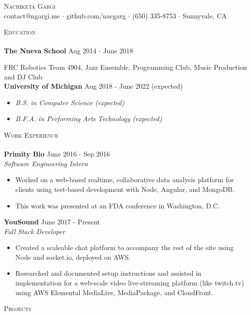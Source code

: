\documentclass[a4paper]{article}
\newcommand{\lineunder} {
    \vspace*{-8pt} \\
    \hspace*{-18pt} \hrulefill \\
}
\newcommand{\header} [1] {
    {\hspace*{-18pt}\vspace*{6pt} \textsc{#1}}
    \vspace*{-6pt} \lineunder
}
\begin{document}
\vspace*{-40pt}
    

\vspace*{-30pt}
\begin{center}
	{\Huge \scshape {Nachiketa Gargi}}\\
	contact@ngargi.me $\cdot$ github.com/nacgarg $\cdot$ (650) 335-8753 $\cdot$ Sunnyvale, CA \\
\end{center}
\header{Education}

\noindent
\textbf{The Nueva School} \hfill Aug 2014 - June 2018\\
\vspace{-4mm}

FRC Robotics Team 4904, Jazz Ensemble, Programming Club, Music Production and DJ Club\\

\noindent
\textbf{University of Michigan} \hfill Aug 2018 - June 2022 (expected)
\vspace{-2mm}
\begin{itemize}
    \setlength{\itemindent}{-3mm}
    \item[] \textit{B.S. in Computer Science (expected)}\vspace{-3mm}
    \item[] \textit{B.F.A. in Performing Arts Technology (expected)}
\end{itemize}

\noindent
\header{Work Experience}


\noindent
\textbf{Primity Bio} \hfill June 2016 - Sep 2016\\
\textit{Software Engineering Intern} \\
\vspace{-4mm}
\begin{itemize} \itemsep 0.1pt
	\item Worked on a web-based realtime, collaborative data analysis platform for clients using test-based development with Node, Angular, and MongoDB.
	\item This work was presented at an FDA conference in Washington, D.C.
\end{itemize}

\noindent
\textbf{YouSound} \hfill June 2017 - Present\\
\textit{Full Stack Developer} \\
\vspace{-4mm}
\begin{itemize} \itemsep 0.1pt
	\item Created a scaleable chat platform to accompany the rest of the site using Node and socket.io, deployed on AWS.
	\item Researched and documented setup instructions and assisted in implementation for a web-scale video live-streaming platform (like twitch.tv) using AWS Elemental MediaLive, MediaPackage, and CloudFront.
\end{itemize}
\header{Projects}
\end{document}
